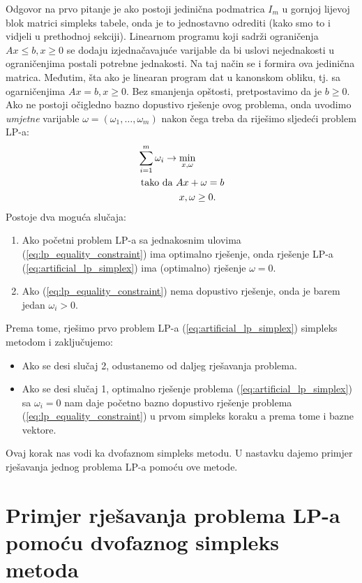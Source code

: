 \documentclass[a4paper, utf8, 11pt, colorlinks]{book}
\begin{document}
 Odgovor na prvo pitanje je ako postoji jedinična podmatrica $I_m$ u gornjoj lijevoj blok matrici simpleks tabele,  onda je to jednostavno odrediti (kako smo to i vidjeli u prethodnoj sekciji). 
 Linearnom programu koji sadrži ograničenja $Ax \leq b, x\geq 0$ se dodaju izjednačavajuće varijable da bi uslovi nejednakosti u ograničenjima postali potrebne jednakosti. Na taj način se i formira ova jedinična matrica. Međutim, šta ako je linearan program dat u kanonskom obliku, tj. sa ogarničenjima $Ax = b, x \geq 0$. Bez smanjenja opštosti, pretpostavimo da je $b \geq 0$. Ako ne postoji očigledno bazno dopustivo rješenje ovog problema, onda uvodimo \emph{umjetne} varijable $\omega = (\omega_1,\ldots, \omega_m)$ nakon čega treba da riješimo sljedeći problem LP-a:
 \begin{align}
      &\sum_{i=1}^m \omega_i \rightarrow \min_{x,\omega} \nonumber \\
      &\mbox{ tako da } A x + \omega = b \nonumber \\
      & \hspace{1.5cm} x, \omega \geq 0. \label{eq:artificial_lp_simplex}
 \end{align}
Postoje dva moguća slučaja:
\begin{enumerate}
    \item Ako početni problem LP-a sa jednakosnim ulovima (\ref{eq:lp_equality_constraint}) 
          ima optimalno rješenje, onda   rješenje LP-a (\ref{eq:artificial_lp_simplex}) ima (optimalno) rješenje $\omega = 0$. 
    \item Ako  (\ref{eq:lp_equality_constraint}) nema dopustivo rješenje, onda je barem jedan $\omega_i > 0$.
\end{enumerate}
 Prema tome, rješimo prvo problem LP-a  (\ref{eq:artificial_lp_simplex}) simpleks metodom i zaključujemo:
 \begin{itemize}
      \item Ako se desi slučaj 2, odustanemo od daljeg rješavanja problema.
      \item Ako se desi slučaj 1, optimalno rješenje problema (\ref{eq:artificial_lp_simplex}) sa $\omega_i=0$ nam daje početno bazno dopustivo rješenje problema (\ref{eq:lp_equality_constraint}) u prvom simpleks koraku a prema tome i bazne vektore. 
 \end{itemize} 
 Ovaj korak nas vodi ka dvofaznom simpleks metodu. U nastavku dajemo primjer rješavanja jednog problema LP-a pomoću ove metode.      
      
 \section{Primjer rješavanja problema LP-a pomoću dvofaznog simpleks metoda}     
 
\end{document}
